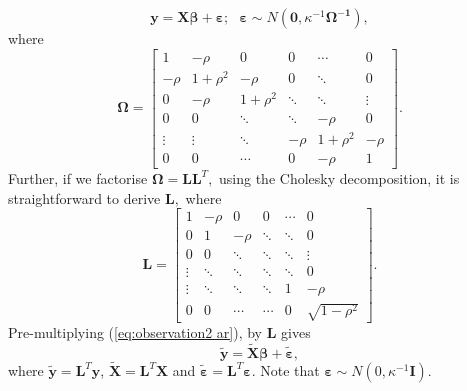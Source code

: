 \documentclass[article]{jss}
\begin{document}
\begin{equation}
\bm{y}=\bm{X}\bm{\beta}+\bm{\varepsilon};\,\,\,\,\bm{\varepsilon}\sim N\left(\bm{0},\kappa^{-1}\bm{\Omega^{-1}}\right),\label{eq:observation2 ar}\end{equation}
 where \[
\bm{\Omega}=\left[\begin{array}{cccccc}
1 & -\rho & 0 & 0 & \cdots & 0\\
-\rho & 1+\rho^{2} & -\rho & 0 & \ddots & 0\\
0 & -\rho & 1+\rho^{2} & \ddots & \ddots & \vdots\\
0 & 0 & \ddots & \ddots & -\rho & 0\\
\vdots & \vdots & \ddots & -\rho & 1+\rho^{2} & -\rho\\
0 & 0 & \cdots & 0 & -\rho & 1\end{array}\right].\]
 Further, if we factorise $\bm{\Omega}=\bm{L}\bm{L}^{T},$ using the
Cholesky decomposition, it is straightforward to derive $\bm{L},$
where\[
\bm{L}=\left[\begin{array}{cccccc}
1 & -\rho & 0 & 0 & \cdots & 0\\
0 & 1 & -\rho & \ddots & \ddots & 0\\
0 & 0 & \ddots & \ddots & \ddots & \vdots\\
\vdots & \ddots & \ddots & \ddots & \ddots & 0\\
\vdots & \ddots & \ddots & \ddots & 1 & -\rho\\
0 & 0 & \cdots & \cdots & 0 & \sqrt{1-\rho^{2}}\end{array}\right].\]
 Pre-multiplying (\ref{eq:observation2 ar}), by $\bm{L}$ gives\begin{equation}
\bm{\tilde{y}}=\bm{\tilde{X}}\bm{\beta}+\bm{\tilde{\varepsilon}},\label{eq:trans_obs_ar}\end{equation}
 where $\bm{\tilde{y}}=\bm{L}^{T}\bm{y}$, $\bm{\tilde{X}}=\bm{L}^{T}\bm{X}$
and $\tilde{\bm{\varepsilon}}=\bm{L}^{T}\bm{\varepsilon}.$ Note that
$\bm{\varepsilon}\sim N(0,\kappa^{-1}\bm{I})$.
\end{document}
